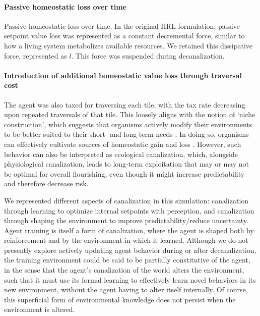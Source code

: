 \paragraph{Passive homeostatic loss over time}

Passive homeostatic loss over time. In the original HRL formulation, passive setpoint value loss was represented as a constant decremental force, similar to how a living system metabolizes available resources. We retained this dissipative force, represented as \(l\). This force was suspended during decanalization. 

\paragraph{Introduction of additional homeostatic value loss through traversal cost}

The agent was also taxed for traversing each tile, with the tax rate decreasing upon repeated traversals of that tile. This loosely aligns with the notion of ‘niche construction’, which suggests that organisms actively modify their environments to be better suited to their short- and long-term needs \parencite{pio-lopez_scale-free_2025}. In doing so, organisms can effectively cultivate sources of homeostatic gain and loss \parencite{lyon_reframing_2021}. However, such behavior can also be interpreted as ecological canalization, which, alongside physiological canalization, leads to long-term exploitation that may or may not be optimal for overall flourishing, even though it might increase predictability and therefore decrease risk. 

We represented different aspects of canalization in this simulation: canalization through learning to optimize internal setpoints with perception, and canalization through shaping the environment to improve predictability/reduce uncertainty. Agent training is itself a form of canalization, where the agent is shaped both by reinforcement and by the environment in which it learned. Although we do not presently explore actively updating agent behavior during or after decanalization, the training environment could be said to be partially constitutive of the agent, in the sense that the agent's canalization of the world alters the environment, such that it must use its formal learning to effectively learn novel behaviors in its new environment, without the agent having to alter itself internally. Of course, this superficial form of environmental knowledge does not persist when the environment is altered. 


